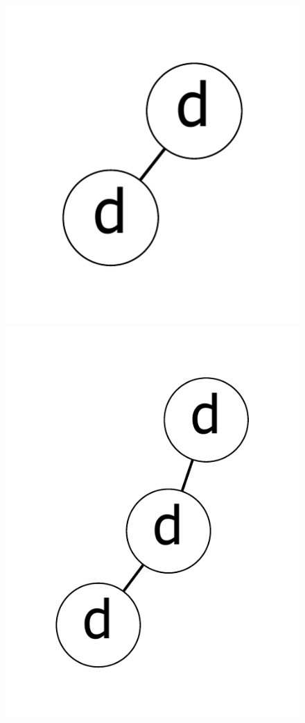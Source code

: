 \documentclass[12pt]{article}
\theoremstyle{plain}
\theoremstyle{definition}
\theoremstyle{remark}
\begin{document}
\begin{figure}[!htb]
\includegraphics[scale=0.25]{Superabundance/all/1[1,1].pdf}
\includegraphics[scale=0.25]{Superabundance/all/011[1,1,2].pdf}

\end{figure}
\end{document}
